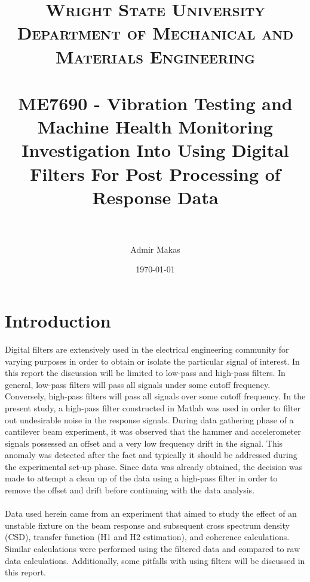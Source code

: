 \documentclass[paper=a4, fontsize=12pt]{scrartcl} %
\title{	
\normalfont \normalsize 
\textsc{Wright State University\\ Department of Mechanical and Materials Engineering} \\ [25pt] %
\horrule{0.5pt} \\[0.4cm] %
\large ME7690 - Vibration Testing and Machine Health Monitoring \\ %
\huge Investigation Into Using Digital Filters For Post Processing of Response Data\\
\horrule{2pt} \\[0.4cm] %
}
\author{Admir Makas} %
\date{\normalsize\today} %
\begin{document}
\maketitle %

\section*{Introduction}
Digital filters are extensively used in the electrical engineering community for varying purposes in order to obtain or isolate the particular signal of interest. In this report the discussion will be limited to low-pass and high-pass filters. In general, low-pass filters will pass all signals under some cutoff frequency. Conversely, high-pass filters will pass all signals over some cutoff frequency. In the present study, a high-pass filter constructed in Matlab was used in order to filter out undesirable noise in the response signals. During data gathering phase of a cantilever beam experiment, it was observed that the hammer and accelerometer signals possessed an offset and a very low frequency drift in the signal. This anomaly was detected after the fact and typically it should be addressed during the experimental set-up phase. Since data was already obtained, the decision was made to attempt a clean up of the data using a high-pass filter in order to remove the offset and drift before continuing with the data analysis.
\\
\\
Data used herein came from an experiment that aimed to study the effect of an unstable fixture on the beam response and subsequent cross spectrum density (CSD), transfer function (H1 and H2 estimation), and coherence calculations. Similar calculations were performed using the filtered data and compared to raw data calculations. Additionally, some pitfalls with using filters will be discussed in this report.
%
%
\end{document}
